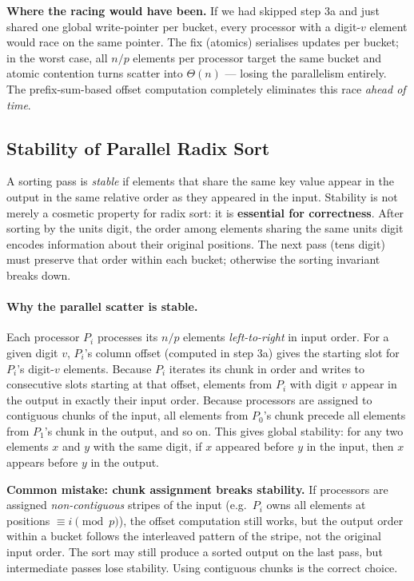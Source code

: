 \begin{ppnote}
\textbf{Where the racing would have been.} If we had skipped step 3a
and just shared one global write-pointer per bucket, every processor
with a digit-$v$ element would race on the same pointer. The fix
(atomics) serialises updates per bucket; in the worst case, all $n/p$
elements per processor target the same bucket and atomic contention
turns scatter into $\Theta(n)$ --- losing the parallelism entirely.
The prefix-sum-based offset computation completely eliminates this
race \emph{ahead of time}.
\end{ppnote}

\subsection{Stability of Parallel Radix Sort}
\label{sec:stability}

A sorting pass is \emph{stable} if elements that share the same key value
appear in the output in the same relative order as they appeared in the input.
Stability is not merely a cosmetic property for radix sort: it is
\textbf{essential for correctness}. After sorting by the units digit, the
order among elements sharing the same units digit encodes information about
their original positions. The next pass (tens digit) must preserve that order
within each bucket; otherwise the sorting invariant breaks down.

\paragraph{Why the parallel scatter is stable.}
Each processor $P_i$ processes its $n/p$ elements \emph{left-to-right} in
input order. For a given digit $v$, $P_i$'s column offset (computed in step
3a) gives the starting slot for $P_i$'s digit-$v$ elements. Because $P_i$
iterates its chunk in order and writes to consecutive slots starting at that
offset, elements from $P_i$ with digit $v$ appear in the output in exactly
their input order. Because processors are assigned to contiguous chunks of
the input, all elements from $P_0$'s chunk precede all elements from $P_1$'s
chunk in the output, and so on. This gives global stability: for any two
elements $x$ and $y$ with the same digit, if $x$ appeared before $y$ in the
input, then $x$ appears before $y$ in the output.

\begin{pppitfall}
\textbf{Common mistake: chunk assignment breaks stability.} If processors
are assigned \emph{non-contiguous} stripes of the input (e.g.\ $P_i$ owns
all elements at positions $\equiv i \pmod{p}$), the offset computation still
works, but the output order within a bucket follows the interleaved pattern
of the stripe, not the original input order. The sort may still produce a
sorted output on the last pass, but intermediate passes lose stability. Using
contiguous chunks is the correct choice.
\end{pppitfall}

